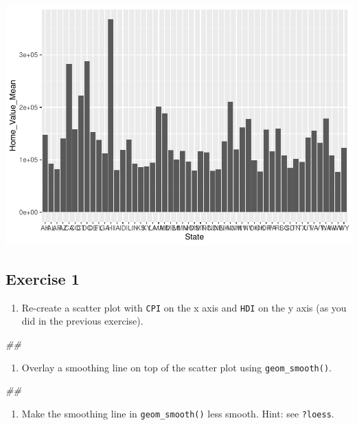 \documentclass[
]{book}
\newenvironment{Shaded}{\begin{snugshade}}{\end{snugshade}}
\newcommand{\CommentTok}[1]{\textcolor[rgb]{0.56,0.35,0.01}{\textit{#1}}}
\providecommand{\tightlist}{%
  \setlength{\itemsep}{0pt}\setlength{\parskip}{0pt}}
\begin{document}
\includegraphics{R/Rgraphics/figures/unnamed-chunk-170-1.pdf}

\hypertarget{exercise-1-2}{%
\subsection{Exercise 1}\label{exercise-1-2}}

\begin{enumerate}
\def\labelenumi{\arabic{enumi}.}
\tightlist
\item
  Re-create a scatter plot with \texttt{CPI} on the x axis and \texttt{HDI} on the y axis (as you did in the previous exercise).
\end{enumerate}

\begin{Shaded}
\begin{Highlighting}[]
\CommentTok{\#\# }
\end{Highlighting}
\end{Shaded}

\begin{enumerate}
\def\labelenumi{\arabic{enumi}.}
\setcounter{enumi}{1}
\tightlist
\item
  Overlay a smoothing line on top of the scatter plot using \texttt{geom\_smooth()}.
\end{enumerate}

\begin{Shaded}
\begin{Highlighting}[]
\CommentTok{\#\# }
\end{Highlighting}
\end{Shaded}

\begin{enumerate}
\def\labelenumi{\arabic{enumi}.}
\setcounter{enumi}{2}
\tightlist
\item
  Make the smoothing line in \texttt{geom\_smooth()} less smooth. Hint: see \texttt{?loess}.
\end{enumerate}
\end{document}
